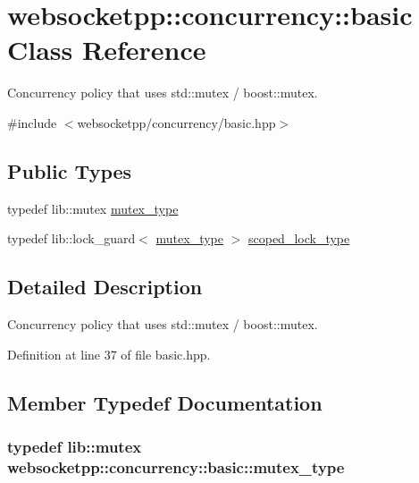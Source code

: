 \hypertarget{classwebsocketpp_1_1concurrency_1_1basic}{}\section{websocketpp\+:\+:concurrency\+:\+:basic Class Reference}
\label{classwebsocketpp_1_1concurrency_1_1basic}


Concurrency policy that uses std\+::mutex / boost\+::mutex.  




{\ttfamily \#include $<$websocketpp/concurrency/basic.\+hpp$>$}

\subsection*{Public Types}
\begin{DoxyCompactItemize}
\item 
typedef lib\+::mutex \hyperlink{classwebsocketpp_1_1concurrency_1_1basic_aa017bc1a233b748f5e0e56b5e8a8c0bc}{mutex\+\_\+type}
\item 
typedef lib\+::lock\+\_\+guard$<$ \hyperlink{classwebsocketpp_1_1concurrency_1_1basic_aa017bc1a233b748f5e0e56b5e8a8c0bc}{mutex\+\_\+type} $>$ \hyperlink{classwebsocketpp_1_1concurrency_1_1basic_ac5f4f16695c8c578face2e4dac291b93}{scoped\+\_\+lock\+\_\+type}
\end{DoxyCompactItemize}


\subsection{Detailed Description}
Concurrency policy that uses std\+::mutex / boost\+::mutex. 

Definition at line 37 of file basic.\+hpp.



\subsection{Member Typedef Documentation}
\hypertarget{classwebsocketpp_1_1concurrency_1_1basic_aa017bc1a233b748f5e0e56b5e8a8c0bc}{}
\subsubsection[{mutex\+\_\+type}]{\setlength{\rightskip}{0pt plus 5cm}typedef lib\+::mutex {\bf websocketpp\+::concurrency\+::basic\+::mutex\+\_\+type}}\label{classwebsocketpp_1_1concurrency_1_1basic_aa017bc1a233b748f5e0e56b5e8a8c0bc}


